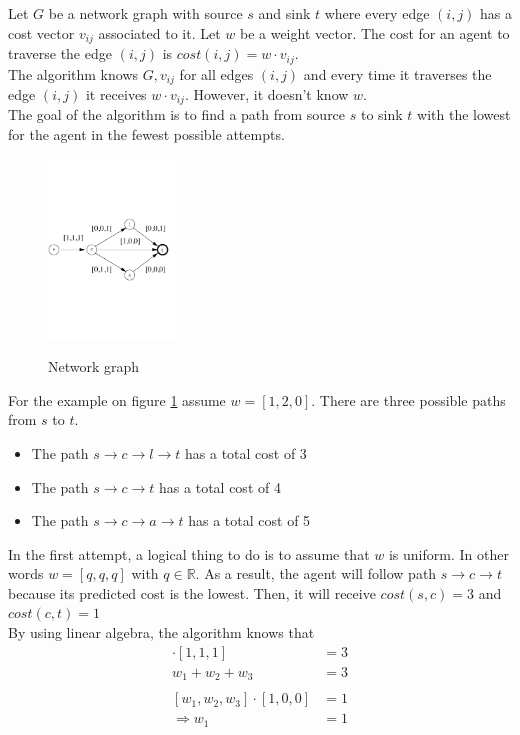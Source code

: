 Let $G$ be a network graph with source $s$ and sink $t$ where every edge $(i,j)$ has a cost vector $v_{ij}$ associated to it. Let $w$ be a weight vector. The cost for an agent to traverse the edge $(i,j)$ is $cost(i,j)=w \cdot v_{ij}$. \\

The algorithm knows $G, v_{ij}$ for all edges $(i,j)$  and every time it traverses the edge $(i,j)$ it receives $w \cdot v_{ij}$. However, it doesn't know $w$.  \\

The goal of the algorithm is to find a path from source $s$ to sink $t$ with the lowest for the agent in the fewest possible attempts.

\begin{figure}
  \centering
  \includegraphics[width=0.3\textwidth]{figures/section3.pdf}
  \label{fig:sec3.1}
  \caption{Network graph}
\end{figure}

For the example on figure \ref{fig:sec3.1} assume $w=[1,2,0]$. There are three possible paths from $s$ to $t$.
\begin{itemize}
  \item The path $s\to c \to l \to t$ has a total cost of 3
  \item The path $s\to c \to t$ has a total cost of 4
  \item The path $s\to c \to a \to t$ has a total cost of 5
\end{itemize}

In the first attempt, a logical thing to do is to assume that $w$ is uniform. In other words $w = [q,q,q]$ with $q \in \mathbb{R}$. As a result, the agent will follow path $s\to c \to t$ because its predicted cost is the lowest. Then, it will receive $cost(s,c)=3$ and $cost(c,t)=1$  \\

By using linear algebra, the algorithm knows that
\begin{align}
  [w_1,w_2,w_3]\cdot [1,1,1] &=  3 \nonumber\\
  w_1+w_2+w_3 &=  3 \label{eqn:sec3.1}\\
  \nonumber\\
  [w_1,w_2,w_3] \cdot [1,0,0] &= 1 \nonumber\\
  \Rightarrow w_1 &=  1 \label{eqn:sec3.2}
\end{align}

